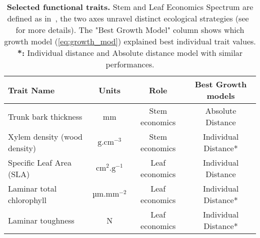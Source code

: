 \begin{table}
	\begin{center}
		\begin{tabular}{lccc}
		\hline \hline
		Trait Name & Units & Role & Best Growth models \\
		\hline
		Trunk bark thickness & mm & Stem economics & Absolute Distance\\
		Xylem density (wood density) & $\text{g}.\text{cm}^{-3}$ & Stem economics & Individual Distance* \\
		Specific Leaf Area (SLA) & $\text{cm}^2.\text{g}^{-1}$ & Leaf economics & Individual Distance\\
		Laminar total chlorophyll & $\text{µm}.\text{mm}^{-2}$  & Leaf economics & Individual Distance*\\
		Laminar toughness & N & Leaf economics & Individual Distance*\\
		\hline \hline
		\end{tabular}
		\caption{\textbf{Selected functional traits.} Stem and Leaf Economics Spectrum are defined as in~\citep{baraloto_decoupled_2010}, the two axes unravel distinct ecological strategies (see~ for more details). The "Best Growth Model" column shows which growth model (\autoref{eq:growth_mod}) explained best individual trait values. \textbf{*:} Individual distance and Absolute distance model with similar performances.} 
		\label{tab:seltraits}
	\end{center}
\end{table}

